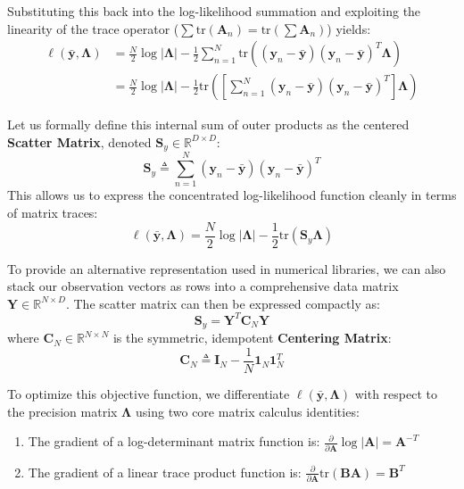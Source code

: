 \documentclass{article}
\begin{document}
Substituting this back into the log-likelihood summation and exploiting the linearity of the trace operator ($\sum \text{tr}(\mathbf{A}_n) = \text{tr}(\sum \mathbf{A}_n)$) yields:
\begin{align*}
\ell(\bar{\mathbf{y}}, \boldsymbol{\Lambda}) &= \frac{N}{2}\log|\boldsymbol{\Lambda}| - \frac{1}{2}\sum_{n=1}^N \text{tr}\left( (\mathbf{y}_n - \bar{\mathbf{y}})(\mathbf{y}_n - \bar{\mathbf{y}})^T \boldsymbol{\Lambda} \right) \\
&= \frac{N}{2}\log|\boldsymbol{\Lambda}| - \frac{1}{2}\text{tr}\left( \left[\sum_{n=1}^N (\mathbf{y}_n - \bar{\mathbf{y}})(\mathbf{y}_n - \bar{\mathbf{y}})^T\right] \boldsymbol{\Lambda} \right)
\end{align*}

Let us formally define this internal sum of outer products as the centered \textbf{Scatter Matrix}, denoted $\mathbf{S}_y \in \mathbb{R}^{D \times D}$:
\begin{equation}
\mathbf{S}_y \triangleq \sum_{n=1}^N (\mathbf{y}_n - \bar{\mathbf{y}})(\mathbf{y}_n - \bar{\mathbf{y}})^T
\end{equation}
This allows us to express the concentrated log-likelihood function cleanly in terms of matrix traces:
\begin{equation}
\ell(\bar{\mathbf{y}}, \boldsymbol{\Lambda}) = \frac{N}{2}\log|\boldsymbol{\Lambda}| - \frac{1}{2}\text{tr}(\mathbf{S}_y \boldsymbol{\Lambda})
\end{equation}

To provide an alternative representation used in numerical libraries, we can also stack our observation vectors as rows into a comprehensive data matrix $\mathbf{Y} \in \mathbb{R}^{N \times D}$. The scatter matrix can then be expressed compactly as:
\begin{equation}
\mathbf{S}_y = \mathbf{Y}^T \mathbf{C}_N \mathbf{Y}
\end{equation}
where $\mathbf{C}_N \in \mathbb{R}^{N \times N}$ is the symmetric, idempotent \textbf{Centering Matrix}:
\begin{equation}
\mathbf{C}_N \triangleq \mathbf{I}_N - \frac{1}{N}\mathbf{1}_N\mathbf{1}_N^T
\end{equation}

To optimize this objective function, we differentiate $\ell(\bar{\mathbf{y}}, \boldsymbol{\Lambda})$ with respect to the precision matrix $\boldsymbol{\Lambda}$ using two core matrix calculus identities:
\begin{enumerate}
    \item The gradient of a log-determinant matrix function is: $\frac{\partial}{\partial \mathbf{A}}\log|\mathbf{A}| = \mathbf{A}^{-T}$
    \item The gradient of a linear trace product function is: $\frac{\partial}{\partial \mathbf{A}}\text{tr}(\mathbf{B}\mathbf{A}) = \mathbf{B}^T$
\end{enumerate}
\end{document}
